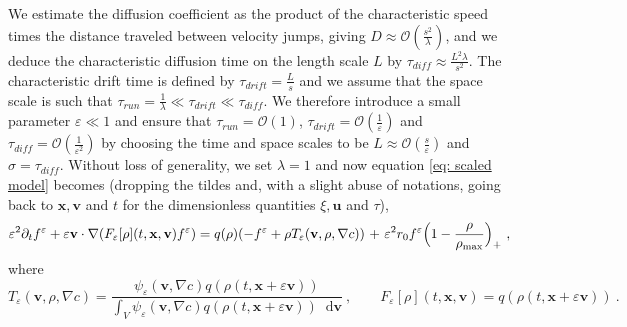 \documentclass[review,onefignum,onetabnum]{siamart220329}
\newcommand*\diff{\mathop{}\!\mathrm{d}}
\begin{document}
We estimate the diffusion coefficient as the product of the characteristic speed times the distance traveled between velocity jumps, giving $D \approx \mathcal{O}(\frac{s^2}{\lambda})$, and we deduce the characteristic diffusion time on the length scale $L$ by $\tau_{diff} \approx \frac{L^2 \lambda}{s^2}$. The characteristic drift time is defined by $\tau_{drift} = \frac{L}{s}$ and we assume that the space scale is such that $\tau_{run} = \frac{1}{\lambda} \ll \tau_{drift} \ll \tau_{diff}$. We therefore introduce a small parameter $\varepsilon \ll 1$ and ensure that $\tau_{run} = \mathcal{O}(1)$, $\tau_{drift} = \mathcal{O}(\frac{1}{\varepsilon})$ and $\tau_{diff} = \mathcal{O}(\frac{1}{\varepsilon^2})$ by choosing the time and space scales to be $L \approx \mathcal{O}(\frac{s}{\varepsilon})$ and $\sigma = \tau_{diff}$. Without loss of generality, we set $\lambda = 1$ and now equation \cref{eq: scaled model} becomes (dropping the tildes {and, with a slight abuse of notations, going back to $\mathbf{x},\mathbf{v}$ and $t$ for the dimensionless quantities $\xi, \mathbf{u}$ and $\tau$),
\begin{equation}
    \varepsilon^2 \partial_t f^\varepsilon+\varepsilon\mathbf{v}\cdot \nabla(F_\varepsilon[\rho](t,\mathbf{x},\mathbf{v}) f^\varepsilon) = q(\rho)(-f^\varepsilon+\rho T_\varepsilon(\mathbf{v},\rho,\nabla c))\ {+\ \varepsilon^2 r_0f^\varepsilon\Bigl(1-\frac{\rho}{\rho_{\textnormal{max}}} \Bigr)_+}\ , \label{eq: inital model with scaling}
\end{equation}
\noindent where
\begin{equation}\label{TepsFeps}
    T_\varepsilon(\mathbf{v},\rho,\nabla c)=\frac{\psi_\varepsilon(\mathbf{v},\nabla c) q(\rho(t,\mathbf{x}+\varepsilon \mathbf{v}))}{\displaystyle\int_{V}\psi_\varepsilon(\mathbf{v},\nabla c) q(\rho(t,\mathbf{x}+\varepsilon \mathbf{v})) \diff \mathbf{v}}\ ,\qquad
    F_\varepsilon[\rho](t,\mathbf{x},\mathbf{v}) = q(\rho(t,\mathbf{x}+\varepsilon \mathbf{v}))\ .
\end{equation}
} 
\end{document}
